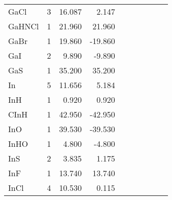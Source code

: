 \begin{table}
\begin{center}
\begin{tabular}{lrrrrrrrrr}
  GaCl      &   3 &   16.087 &    2.147 &     &          &          &     &          &          \\
  GaHNCl    &   1 &   21.960 &   21.960 &     &          &          &     &          &          \\
  GaBr      &   1 &   19.860 &  -19.860 &     &          &          &     &          &          \\
  GaI       &   2 &    9.890 &   -9.890 &     &          &          &     &          &          \\
  GaS       &   1 &   35.200 &   35.200 &     &          &          &     &          &          \\
  In        &   5 &   11.656 &    5.184 &     &          &          &     &          &          \\
  InH       &   1 &    0.920 &    0.920 &     &          &          &     &          &          \\
  CInH      &   1 &   42.950 &  -42.950 &     &          &          &     &          &          \\
  InO       &   1 &   39.530 &  -39.530 &     &          &          &     &          &          \\
  InHO      &   1 &    4.800 &   -4.800 &     &          &          &     &          &          \\
  InS       &   2 &    3.835 &    1.175 &     &          &          &     &          &          \\
  InF       &   1 &   13.740 &   13.740 &     &          &          &     &          &          \\
  InCl      &   4 &   10.530 &    0.115 &     &          &          &     &          &          \\
\hline
\end{tabular}
\end{center}
\end{table}

